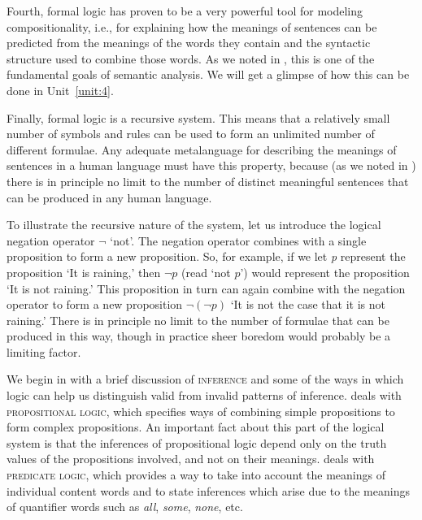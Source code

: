 Fourth, formal logic has proven to be a very powerful tool for modeling compositionality, i.e., for explaining how the meanings of sentences can be predicted from the meanings of the words they contain and the syntactic structure used to combine those words. As we noted in , this is one of the fundamental goals of semantic analysis. We will get a glimpse of how this can be done in Unit~\ref{unit:4}.



Finally, formal logic is a recursive system. This means that a relatively small number of symbols and rules can be used to form an unlimited number of different formulae. Any adequate metalanguage for describing the meanings of sentences in a human language must have this property, because (as we noted in ) there is in principle no limit to the number of distinct meaningful sentences that can be produced in any human language.



To illustrate the recursive nature of the system, let us introduce the logical negation operator $\neg$ ‘not’. The negation operator combines with a single proposition to form a new proposition. So, for example, if we let \textit{p} represent the proposition ‘It is raining,’ then $\neg p$ (read ‘not $p$’) would represent the proposition ‘It is not raining.’ This proposition in turn can again combine with the negation operator to form a new proposition $\neg (\neg p)$ ‘It is not the case that it is not raining.’ There is in principle no limit to the number of formulae that can be produced in this way, though in practice sheer boredom would probably be a limiting factor.



We begin in  with a brief discussion of \textsc{inference} and some of the ways in which logic can help us distinguish valid from invalid patterns of inference.  deals with \textsc{propositional logic}, which specifies ways of combining simple propositions to form complex propositions. An important fact about this part of the logical system is that the inferences of propositional logic depend only on the truth values of the propositions involved, and not on their meanings.  deals with \textsc{predicate logic}, which provides a way to take into account the meanings of individual content words and to state inferences which arise due to the meanings of quantifier words such as \textit{all}, \textit{some}, \textit{none}, etc.


